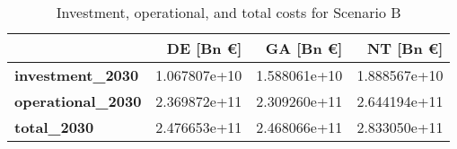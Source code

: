 \begin{table}
    \centering
    \caption{Investment, operational, and total costs for Scenario B}
    \label{tab:costs_C1_SB}
\begin{tabular}{lrrr}
\toprule
{} &     DE [Bn €] &     GA [Bn €] &     NT [Bn €] \\
\midrule
\textbf{investment\_2030 } &  1.067807e+10 &  1.588061e+10 &  1.888567e+10 \\
\textbf{operational\_2030} &  2.369872e+11 &  2.309260e+11 &  2.644194e+11 \\
\textbf{total\_2030      } &  2.476653e+11 &  2.468066e+11 &  2.833050e+11 \\
\bottomrule
\end{tabular}
\end{table}
